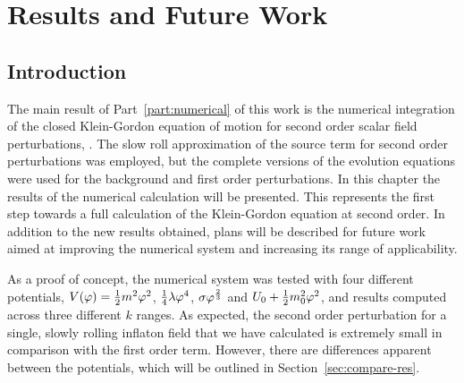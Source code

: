 \renewcommand{\CVSrevision}{\version$Id: results.tex,v 1.31 2009/11/20 15:53:37 ith Exp $}

\chapter{Results and Future Work}
\label{ch:results}


\section{Introduction}
\label{sec:intro-res}

The main result of Part~\ref{part:numerical} of this work is the numerical
integration of
the closed Klein-Gordon equation of motion for second order scalar field
perturbations, . The slow
roll approximation of the source term for second order perturbations was employed,
but the complete versions of the evolution equations were used for the
background and first
order perturbations. In this chapter the results of the numerical calculation will be
presented. This represents the
first step towards a full calculation of the Klein-Gordon equation at second order.
In addition to the new results obtained, plans will be described for future
work aimed at improving the numerical system and increasing its range
of applicability. 

As a proof of concept, the numerical system was tested with four different
potentials, $V(\varphi)=\frac{1}{2} m^2 \varphi^2$, $\frac{1}{4}\lambda\varphi^4$, $\sigma\varphi^{\frac{2}{3}}$ and
$U_0 + \frac{1}{2} m_0^2 \varphi^2$, and results computed across three
different $k$ ranges. As expected, the second order perturbation for a single,
slowly rolling inflaton field that we have calculated is extremely
small in comparison with the first order term. However, there are
differences apparent between the potentials, which will be outlined in
Section~\ref{sec:compare-res}.

